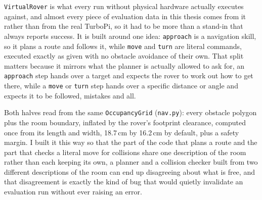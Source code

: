 \texttt{VirtualRover} is what every run without physical hardware actually
executes against, and almost every piece of evaluation data in this thesis
comes from it rather than from the real TurboPi, so it had to be more than
a stand-in that always reports success. It is built around one idea:
\texttt{approach} is a navigation skill, so it plans a route and follows
it, while \texttt{move} and \texttt{turn} are literal commands, executed
exactly as given with no obstacle avoidance of their own. That split
matters because it mirrors what the planner is actually allowed to ask for,
an \texttt{approach} step hands over a target and expects the rover to work
out how to get there, while a \texttt{move} or \texttt{turn} step hands
over a specific distance or angle and expects it to be followed, mistakes
and all.

Both halves read from the same \texttt{OccupancyGrid} (\texttt{nav.py}):
every obstacle polygon plus the room boundary, inflated by the rover's
footprint clearance, computed once from its length and width, 18.7\,cm by
16.2\,cm by default, plus a safety margin. I built it this way so that the
part of the code that plans a route and the part that checks a literal move
for collisions share one description of the room rather than each keeping
its own, a planner and a collision checker built from two different
descriptions of the room can end up disagreeing about what is free, and
that disagreement is exactly the kind of bug that would quietly invalidate
an evaluation run without ever raising an error.

